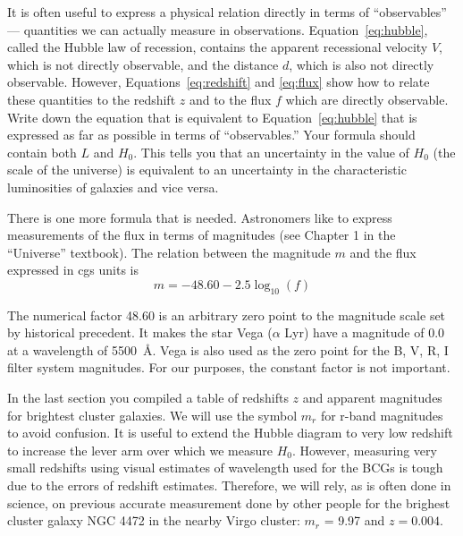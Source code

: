 \documentclass[12pt]{article}
\begin{document}
It is often useful to express a physical relation directly in terms of
``observables'' --- quantities we can actually measure in
observations. Equation~\ref{eq:hubble}, called the Hubble law of
recession, contains the apparent recessional velocity $V$, which is
not directly observable, and the distance $d$, which is also not
directly observable.  However, Equations~\ref{eq:redshift} and
\ref{eq:flux} show how to relate these quantities to the redshift $z$
and to the flux $f$ which are directly observable. Write down the
equation that is equivalent to Equation~\ref{eq:hubble} that is
expressed as far as possible in terms of ``observables.''  Your
formula should contain both $L$  and $H_0$. This tells you that an
uncertainty in the value of $H_0$ (the scale of the universe) is
equivalent to an uncertainty in the characteristic luminosities of
galaxies and vice versa.

There is one more formula that is needed. Astronomers like to express
measurements of the flux in terms of magnitudes (see Chapter 1 in the
``Universe'' textbook).  The relation between the magnitude $m$ and
the flux expressed in cgs units is
\begin{equation}
m=-48.60-2.5\log_{10}(f)
\label{eq:mag}
\end{equation}

The numerical factor 48.60 is an arbitrary zero point to the magnitude scale set
by historical precedent. It makes the star Vega ($\alpha$ Lyr) have a magnitude
of 0.0 at a wavelength of 5500~{\AA}. Vega is also used as the zero point for
the B, V, R, I filter system magnitudes. For our purposes, 
the constant factor is not important.

In the last section you compiled a table of redshifts $z$ and apparent
magnitudes for brightest cluster galaxies. We will use the symbol $m_r$ for
r-band magnitudes to avoid confusion. It is useful to extend the Hubble diagram
to very low redshift to increase the lever arm over which we measure $H_0$. 
However, measuring very small redshifts using visual estimates of wavelength used
for the BCGs is tough due to the errors of redshift estimates. Therefore, 
we will rely, as is often done in science, on previous accurate measurement
done by other people for the brighest cluster galaxy NGC 4472 in the nearby Virgo cluster: 
$m_r$ = 9.97 and $z = 0.004$.
\end{document}
